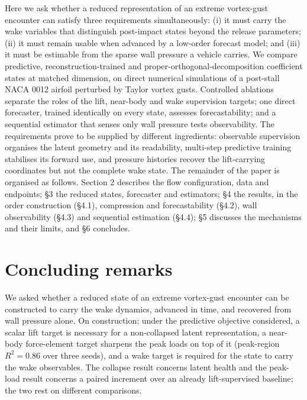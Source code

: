 Here we ask whether a reduced representation of an extreme vortex-gust
encounter can satisfy three requirements simultaneously: (i) it must
carry the wake variables that distinguish post-impact states beyond the
release parameters; (ii) it must remain usable when advanced by a
low-order forecast model; and (iii) it must be estimable from the sparse
wall pressure a vehicle carries. We compare predictive,
reconstruction-trained and proper-orthogonal-decomposition coefficient
states at matched dimension, on direct numerical simulations of a
post-stall NACA 0012 airfoil perturbed by Taylor vortex gusts.
Controlled ablations separate the roles of the lift, near-body and wake
supervision targets; one direct forecaster, trained identically on every
state, assesses forecastability; and a sequential estimator that senses
only wall pressure tests observability. The requirements prove to be
supplied by different ingredients: observable supervision organises the
latent geometry and its readability, multi-step predictive training
stabilises its forward use, and pressure histories recover the
lift-carrying coordinates but not the complete wake state. The remainder
of the paper is organised as follows. Section 2 describes the flow
configuration, data and endpoints; \S 3 the reduced states, forecaster
and estimators; \S 4 the results, in the order construction (\S 4.1),
compression and forecastability (\S 4.2), wall observability (\S 4.3)
and sequential estimation (\S 4.4); \S 5 discusses the mechanisms and
their limits, and \S 6 concludes.

\section{Concluding remarks}

We asked whether a reduced state of an extreme vortex-gust encounter can
be constructed to carry the wake dynamics, advanced in time, and
recovered from wall pressure alone. On construction: under the
predictive objective considered, a scalar lift target is necessary for a
non-collapsed latent representation, a near-body force-element target
sharpens the peak loads on top of it (peak-region $R^2 = 0.86$ over
three seeds), %
and a wake target is required for the state to carry the wake
observables. The collapse result concerns latent health and the
peak-load result concerns a paired increment over an already
lift-supervised baseline; the two rest on different comparisons.

